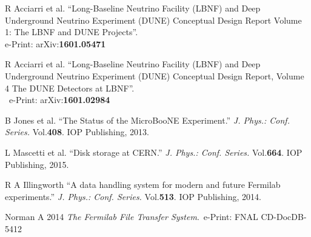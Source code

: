 \documentclass{PoS}
\begin{document}
\begin{thebibliography}{99}



R Acciarri et al.
``Long-Baseline Neutrino Facility (LBNF) and Deep Underground Neutrino Experiment (DUNE) Conceptual Design Report Volume 1: The LBNF and DUNE Projects''.\\ e-Print: arXiv:\textbf{1601.05471}

R Acciarri et al.
``Long-Baseline Neutrino Facility (LBNF) and Deep Underground Neutrino Experiment (DUNE) Conceptual Design Report, Volume 4 The DUNE Detectors at LBNF''.\\~e-Print: arXiv:\textbf{1601.02984}


B Jones et al.  ``The Status of the MicroBooNE Experiment.''  \textit{J. Phys.: Conf. Series.} Vol.\textbf{408}. IOP Publishing, 2013.

 L Mascetti et al. ``Disk storage at CERN.'' \textit{J. Phys.: Conf. Series.} Vol.\textbf{664}. IOP Publishing, 2015.












R A Illingworth ``A data handling system for modern and future Fermilab experiments.''  \textit{J. Phys.: Conf. Series.} Vol.\textbf{513}. IOP Publishing, 2014.


Norman A 2014 \textit{The Fermilab File Transfer System}.~e-Print: FNAL CD-DocDB-5412



\end{thebibliography}
\end{document}
